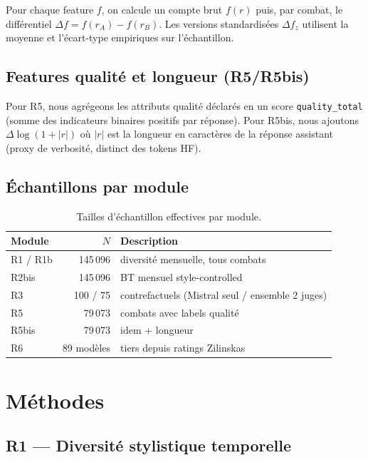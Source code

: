 \documentclass[11pt,a4paper]{article}
\begin{document}
Pour chaque feature $f$, on calcule un compte brut $f(r)$ puis, par combat,
le différentiel $\Delta f = f(r_A) - f(r_B)$. Les versions standardisées
$\Delta f_z$ utilisent la moyenne et l'écart-type empiriques sur l'échantillon.

\subsection{Features qualité et longueur (R5/R5bis)}

Pour R5, nous agrégeons les attributs qualité déclarés en un score
\texttt{quality\_total} (somme des indicateurs binaires positifs par réponse).
Pour R5bis, nous ajoutons $\Delta \log(1 + |r|)$ où $|r|$ est la longueur en
caractères de la réponse assistant (proxy de verbosité, distinct des tokens HF).

\subsection{Échantillons par module}

\begin{table}[H]
\centering
\caption{Tailles d'échantillon effectives par module.}
\label{tab:samples}
\begin{tabular}{lrl}
\toprule
Module & $N$ & Description \\
\midrule
R1 / R1b & 145\,096 & diversité mensuelle, tous combats \\
R2bis & 145\,096 & BT mensuel style-controlled \\
R3 & 100 / 75 & contrefactuels (Mistral seul / ensemble 2 juges) \\
R5 & 79\,073 & combats avec labels qualité \\
R5bis & 79\,073 & idem + longueur \\
R6 & 89 modèles & tiers depuis ratings Zilinskas \\
\bottomrule
\end{tabular}
\end{table}

\section{Méthodes}
\label{sec:methods}

\subsection{R1 --- Diversité stylistique temporelle}
\end{document}
